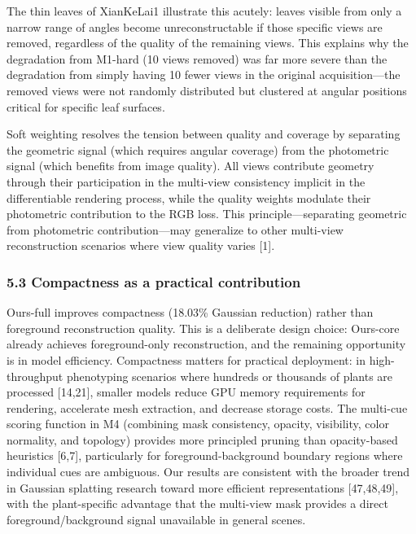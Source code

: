 \documentclass[11pt,a4paper]{article}
\begin{document}
The thin leaves of XianKeLai1 illustrate this acutely: leaves visible
from only a narrow range of angles become unreconstructable if those
specific views are removed, regardless of the quality of the remaining
views. This explains why the degradation from M1-hard (10 views removed)
was far more severe than the degradation from simply having 10 fewer
views in the original acquisition---the removed views were not randomly
distributed but clustered at angular positions critical for specific
leaf surfaces.

Soft weighting resolves the tension between quality and coverage by
separating the geometric signal (which requires angular coverage) from
the photometric signal (which benefits from image quality). All views
contribute geometry through their participation in the multi-view
consistency implicit in the differentiable rendering process, while the
quality weights modulate their photometric contribution to the RGB loss.
This principle---separating geometric from photometric
contribution---may generalize to other multi-view reconstruction
scenarios where view quality varies {[}1{]}.

\subsubsection{5.3 Compactness as a practical
contribution}\label{compactness-as-a-practical-contribution}

Ours-full improves compactness (18.03\% Gaussian reduction) rather than
foreground reconstruction quality. This is a deliberate design choice:
Ours-core already achieves foreground-only reconstruction, and the
remaining opportunity is in model efficiency. Compactness matters for
practical deployment: in high-throughput phenotyping scenarios where
hundreds or thousands of plants are processed {[}14,21{]}, smaller
models reduce GPU memory requirements for rendering, accelerate mesh
extraction, and decrease storage costs. The multi-cue scoring function
in M4 (combining mask consistency, opacity, visibility, color normality,
and topology) provides more principled pruning than opacity-based
heuristics {[}6,7{]}, particularly for foreground-background boundary
regions where individual cues are ambiguous. Our results are consistent
with the broader trend in Gaussian splatting research toward more
efficient representations {[}47,48,49{]}, with the plant-specific
advantage that the multi-view mask provides a direct
foreground/background signal unavailable in general scenes.
\end{document}
